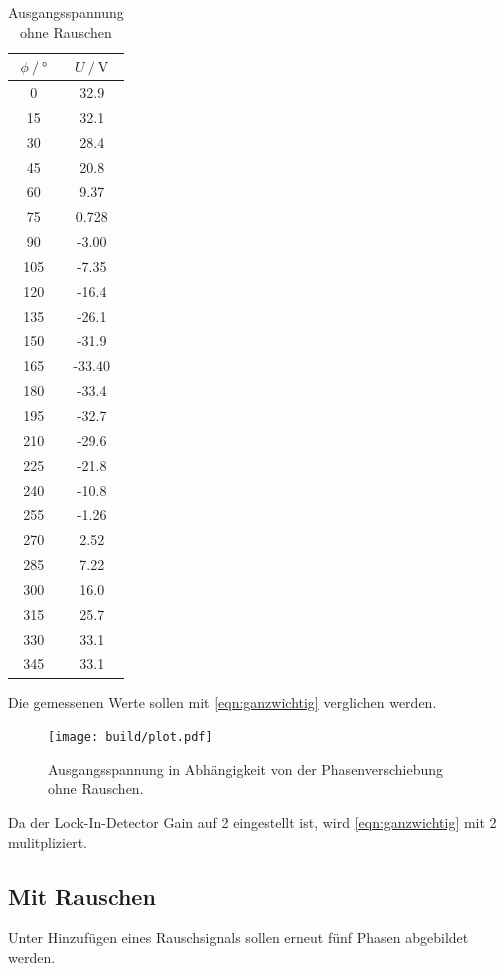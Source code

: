\begin{table}
  \centering
  \caption{Ausgangsspannung ohne Rauschen}
  \label{tab:ohne_Rauschen}
  \begin{tabular}{cc}
    \toprule {$\phi \:/\: °$} & {$U \:/\: \si{\volt}$} \\
    \midrule
     0  & 32.9  \\
     15  & 32.1  \\
     30 & 28.4 \\
     45 & 20.8 \\
     60 & 9.37 \\
     75 & 0.728\\
     90 & -3.00 \\
     105 & -7.35  \\
     120 & -16.4 \\
     135 & -26.1 \\
     150 & -31.9  \\
     165 & -33.40 \\
     180 & -33.4  \\
     195 & -32.7  \\
     210 & -29.6  \\
     225 & -21.8  \\
     240 & -10.8\\
     255 & -1.26  \\
     270 & 2.52  \\
     285 & 7.22  \\
     300 & 16.0 \\
     315 & 25.7 \\
     330 & 33.1 \\
     345 & 33.1 \\
\bottomrule
\end{tabular}
\end{table}

Die gemessenen Werte sollen mit \ref{eqn:ganzwichtig} verglichen werden.

\begin{figure}
  \centering
  \texttt{[image: build/plot.pdf]}
\caption{Ausgangsspannung in Abhängigkeit von der Phasenverschiebung ohne Rauschen.}
  \label{fig:ohne_rauschen}
\end{figure}
Da der Lock-In-Detector Gain auf 2 eingestellt ist, wird \ref{eqn:ganzwichtig} mit 2 mulitpliziert.

 \subsection {Mit Rauschen}
 Unter Hinzufügen eines Rauschsignals sollen erneut fünf Phasen abgebildet werden.

